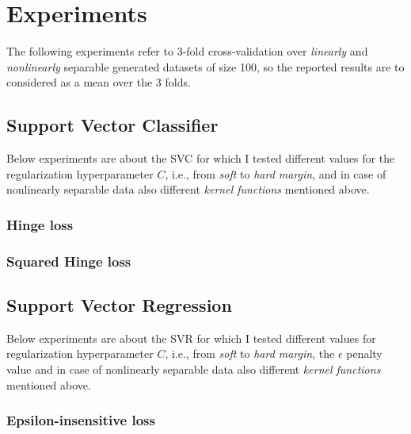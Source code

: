 \section{Experiments}

The following experiments refer to 3-fold cross-validation over \emph{linearly} and \emph{nonlinearly} separable generated datasets of size 100, so the reported results are to considered as a mean over the 3 folds.

\subsection{Support Vector Classifier}

Below experiments are about the SVC for which I tested different values for the regularization hyperparameter $C$, i.e., from \emph{soft} to \emph{hard margin}, and in case of nonlinearly separable data also different \emph{kernel functions} mentioned above.

\subsubsection{Hinge loss}











\subsubsection{Squared Hinge loss}




\subsection{Support Vector Regression}

Below experiments are about the SVR for which I tested different values for regularization hyperparameter $C$, i.e., from \emph{soft} to \emph{hard margin}, the $\epsilon$ penalty value and in case of nonlinearly separable data also different \emph{kernel functions} mentioned above.

\subsubsection{Epsilon-insensitive loss}

